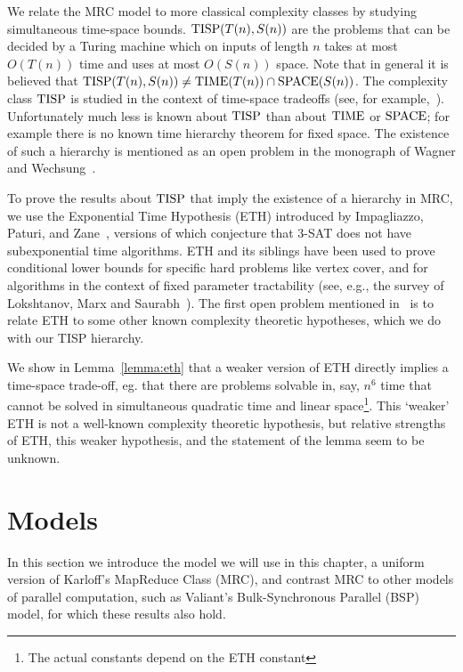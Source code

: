 We relate the MRC model to more classical complexity classes by studying
simultaneous time-space bounds. $\textup{TISP}(T(n),S(n))$ are the problems that can be
decided by a Turing machine which on inputs of length $n$ takes at most
$O(T(n))$ time and uses at most $O(S(n))$ space. Note that in general it is
believed that $\textup{TISP}(T(n), S(n)) \neq \textup{TIME}(T(n)) \cap \textup{SPACE}(S(n))$.  The
complexity class $\textup{TISP}$ is studied in the context of time-space tradeoffs
(see, for example,~\cite{Fortnow00,Williams08}). Unfortunately much less is
known about $\textup{TISP}$ than about $\textup{TIME}$ or $\textup{SPACE}$; for example there is no
known time hierarchy theorem for fixed space. The existence of such a hierarchy
is mentioned as an open problem in the monograph of Wagner and
Wechsung~\cite{WagnerW86}.

To prove the results about $\textup{TISP}$ that imply the existence of a hierarchy in
MRC, we use the Exponential Time Hypothesis (ETH) introduced by Impagliazzo,
Paturi, and Zane~\cite{ImpagliazzoP99,ImpagliazzoPZ01}, versions of which
conjecture that 3-SAT does not have subexponential time algorithms. ETH and its
siblings have been used to prove conditional lower bounds for specific hard
problems like vertex cover, and for algorithms in the context of fixed
parameter tractability (see, e.g., the survey of Lokshtanov, Marx and
Saurabh~\cite{LokshtanovMS11}). The first open problem mentioned
in~\cite{LokshtanovMS11} is to relate ETH to some other known complexity
theoretic hypotheses, which we do with our TISP hierarchy.

We show in Lemma~\ref{lemma:eth} that a weaker version of ETH directly implies
a time-space trade-off, eg. that there are problems solvable in, say, $n^6$
time that cannot be solved in simultaneous quadratic time and linear
space\footnote{The actual constants depend on the ETH constant}. This `weaker'
ETH is not a well-known complexity theoretic hypothesis, but relative strengths
of ETH, this weaker hypothesis, and the statement of the lemma seem to be
unknown. 

\section{Models} \label{sec:definition}

In this section we introduce the model we will use in this chapter, a uniform
version of Karloff's MapReduce Class (MRC), and contrast MRC to other models of
parallel computation, such as Valiant's Bulk-Synchronous Parallel (BSP) model,
for which these results also hold.

